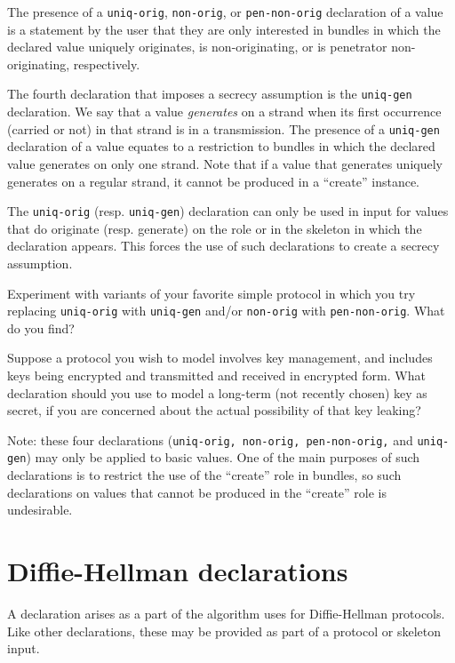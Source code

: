    The
presence of a \texttt{uniq-orig}, \texttt{non-orig}, or
\texttt{pen-non-orig} declaration of a value is a statement by the
user that they are only interested in bundles in which the declared
value uniquely originates, is non-originating, or is penetrator
non-originating, respectively.

  The fourth declaration that
imposes a secrecy assumption is the \texttt{uniq-gen} declaration.  We
say that a value \emph{generates} on a strand when its first
occurrence (carried or not) in that strand is in a transmission.  The
presence of a \texttt{uniq-gen} declaration of a value equates to a
restriction to bundles in which the declared value generates on only
one strand.  Note that if a value that generates uniquely generates on
a regular strand, it cannot be produced in a ``create'' instance.

The \texttt{uniq-orig} (resp. \texttt{uniq-gen}) declaration can only
be used in {\cpsa} input for values that do originate (resp. generate)
on the role or in the skeleton in which the declaration appears.  This
forces the use of such declarations to create a secrecy assumption.

\begin{exercise}
Experiment with variants of your favorite simple protocol in which you
try replacing \texttt{uniq-orig} with \texttt{uniq-gen} and/or
\texttt{non-orig} with \texttt{pen-non-orig}.  What do you find?
\end{exercise}

\begin{exercise}
Suppose a protocol you wish to model involves key management, and
includes keys being encrypted and transmitted and received in
encrypted form.  What declaration should you use to model a long-term
(not recently chosen) key as secret, if you are concerned about the
actual possibility of that key leaking?
\end{exercise}

Note: these four declarations (\texttt{uniq-orig, non-orig,
  pen-non-orig,} and \texttt{uniq-gen}) may only be applied to basic
values.  One of the main purposes of such declarations is to restrict
the use of the ``create'' role in bundles, so such declarations on
values that cannot be produced in the ``create'' role is undesirable.

\section{Diffie-Hellman declarations}
A declaration arises as a part of the algorithm {\cpsa} uses for
Diffie-Hellman protocols.  Like other declarations, these may be
provided as part of a protocol or skeleton input.

